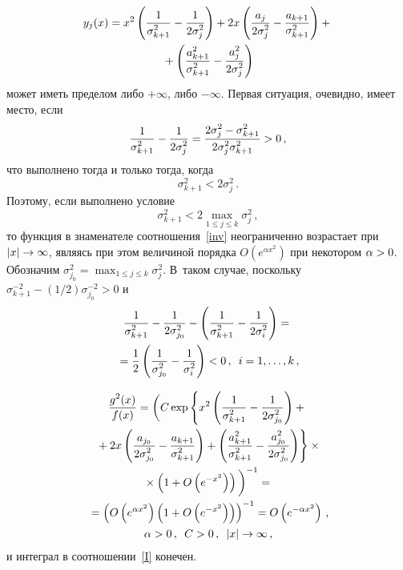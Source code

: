 \begin{multicols}{2}
\noindent
\begin{multline*}
y_j(x)=x^2\left(\fr{1}{\sigma_{k+1}^2}-\fr{1}{2\sigma_j^2}\right)
+2x\left(\fr{a_j}{2\sigma_j^2}-\frac{a_{k+1}}
{\sigma_{k+1}^2}\right)+{}\\
{}+\left(\fr{a_{k+1}^2}{\sigma_{k+1}^2}-\fr{a_j^2}{2\sigma_j^2}\right)
\end{multline*}
может иметь пределом либо $+\infty$, либо $-\infty$. Первая
ситуация, очевидно, имеет место, если
$$
\fr{1}{\sigma_{k+1}^2}-\fr{1}{2\sigma_j^2}=
\fr{2\sigma_j^2-\sigma_{k+1}^2}{2\sigma_j^2\sigma_{k+1}^2}>0\,,
$$
что выполнено тогда и только тогда, когда
$$
\sigma_{k+1}^2<2\sigma_j^2\,.
$$
Поэтому, если выполнено условие
\begin{equation}
\label{CondSigmaNorm}
\sigma_{k+1}^2<2\max_{1\le j\le k}\sigma_j^2\,,
\end{equation}
то функция в знаменателе соотношения~\eqref{inv} неограниченно
возрастает при $|x|\hm\to\infty$, являясь при этом величиной порядка
$O\left(e^{\alpha x^2}\right)$ при некотором $\alpha\hm>0$. Обозначим
$\sigma_{j_0}^2=\max_{1\le j\le k}\sigma_j^2$. В~таком случае,
поскольку $\sigma_{k+1}^{-2}-({1}/{2})\sigma_{j_0}^{-2}>0$ и
\begin{multline*}
\fr{1}{\sigma_{k+1}^2}-\frac{1}{2\sigma_{j_0}^2}-
\left(\fr{1}{\sigma_{k+1}^2}-\fr{1}{2\sigma_i^2}\right)={}\\
{}=
\fr{1}{2}\left(\fr{1}{\sigma_{j_0}^2}-\fr{1}{\sigma_i^2}\right)<0\,,\enskip i=1,\ldots,k\,,
\end{multline*}

\vspace*{-12pt}

\noindent
\begin{multline*}
\fr{g^2(x)}{f(x)}=\bigg(C\exp\left\{x^2
\left(\fr{1}{\sigma_{k+1}^2}-\fr{1}{2\sigma_{j_0}^2}\right)
+{}\right.\\
\left.{}+2x\left(\fr{a_{j_0}}{2\sigma_{j_0}^2}-\fr{a_{k+1}}{\sigma_{k+1}^2}\right)
+\left(\fr{a_{k+1}^2}{\sigma_{k+1}^2}-\fr{a_{j_0}^2}{2\sigma_{j_0}^2}\right)\right\}
\times{}\\
{}\times\left(1+O\left(e^{-x^2}\right)\right)\bigg)^{-1}={}\\
{}=\left({O\left(e^{\alpha x^2}\right)\left(1+O\left(e^{-x^2}\right)\right)}\right)^{-1}=
O\left(e^{-\alpha x^2}\right)\,,\\
\alpha>0\,,\enskip C>0\,,\enskip  |x|\to\infty\,,
\end{multline*}
и интеграл в соотношении~\eqref{I} конечен.


\end{multicols}
